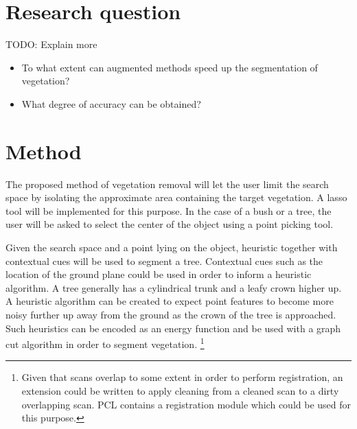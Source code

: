 \documentclass[10pt,twocolumn]{article}
\begin{document}


\section{Research question}

TODO: Explain more
\begin{itemize}
\item To what extent can augmented methods speed up the segmentation of vegetation?
\item What degree of accuracy can be obtained?
\end{itemize}

\section{Method}
The proposed method of vegetation removal will let the user limit the search space by isolating the approximate area containing the target vegetation. A lasso tool will be implemented for this purpose. In the case of a bush or a tree, the user will be asked to select the center of the object using a point picking tool. 

Given the search space and a point lying on the object, heuristic together with contextual cues will be used to segment a tree. Contextual cues such as the location of the ground plane could be used in order to inform a heuristic algorithm. A tree generally has a cylindrical trunk and a leafy crown higher up. A heuristic algorithm can be created to expect point features to become more noisy further up away from the ground as the crown of the tree is approached. Such heuristics can be encoded as an energy function and be used with a graph cut algorithm in order to segment vegetation. \footnote{Given that scans overlap to some extent in order to perform registration, an extension could be written to apply cleaning from a cleaned scan to a dirty overlapping scan. PCL contains a registration module which could be used for this purpose.}
\end{document}
